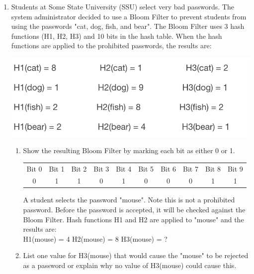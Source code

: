 \documentclass[12pt]{article}
\begin{document}
\renewcommand{\headrulewidth}{0.4pt}
\vspace{-3mm}
\begin{enumerate}
\item Students at Some State University (SSU) select very bad passwords. The system administrator decided to use a Bloom Filter to prevent students from using the passwords "cat, dog, fish, and bear". The Bloom Filter uses 3 hash functions (H1, H2, H3) and 10 bits in the hash table. When the hash functions are applied to the prohibited passwords, the results are:

\begin{center}
\includegraphics[scale=0.5]{prob1_diagram.png} \\
\end{center}
\begin{enumerate}
  \item Show the resulting Bloom Filter by marking each bit as either 0 or 1. \\
  \begin{center}
    \begin{tabular}{ |c|c|c|c|c|c|c|c|c|c| }
     \hline
     Bit 0 & Bit 1 & Bit 2 & Bit 3 & Bit 4 & Bit 5 & Bit 6 & Bit 7 & Bit 8 & Bit 9 \\
     0 & 1 & 1 & 0 & 1 & 0 & 0 & 0 & 1 & 1 \\
     \hline
   \end{tabular}
 \end{center}

A student selects the password "mouse". Note this is not a prohibited password. Before the password is accepted, it will be checked against the Bloom Filter. Hash functions H1 and H2 are applied to "mouse" and the results are: \\
\vspace{5mm}
H1(mouse) = 4 \hspace{5mm}   H2(mouse) = 8 \hspace{5mm}  H3(mouse) = ?
\item List one value for H3(mouse) that would cause the "mouse" to be rejected as a password or explain why no value of H3(mouse) could cause this. \\


\end{enumerate}
\end{enumerate}
\end{document}
